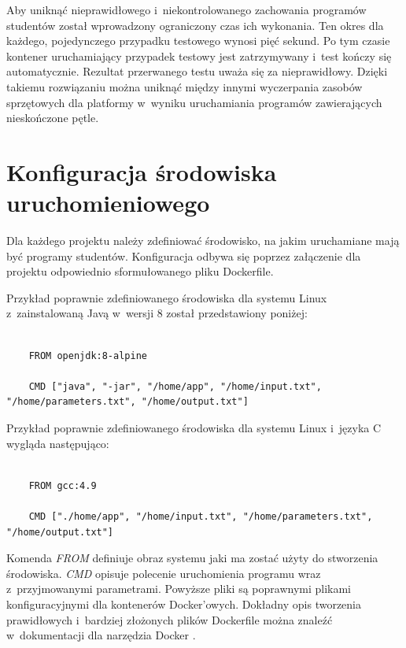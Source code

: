 Aby uniknąć nieprawidłowego i~niekontrolowanego zachowania programów studentów został wprowadzony ograniczony czas ich wykonania.
Ten okres dla każdego, pojedynczego przypadku testowego wynosi pięć sekund.
Po tym czasie kontener uruchamiający przypadek testowy jest zatrzymywany i~test kończy się automatycznie.
Rezultat przerwanego testu uważa się za nieprawidłowy.
Dzięki takiemu rozwiązaniu można uniknąć między innymi wyczerpania zasobów sprzętowych dla platformy w~wyniku uruchamiania programów zawierających nieskończone pętle.


\section {Konfiguracja środowiska uruchomieniowego}
\label{environment_configuration}

Dla każdego projektu należy zdefiniować środowisko, na jakim uruchamiane mają być programy studentów.
Konfiguracja odbywa się poprzez załączenie dla projektu odpowiednio sformułowanego pliku Dockerfile.

Przykład poprawnie zdefiniowanego środowiska dla systemu Linux z~zainstalowaną Javą w~wersji 8 został przedstawiony poniżej:

{\selectfont
\tiny
\begin{lstlisting}

    FROM openjdk:8-alpine

    CMD ["java", "-jar", "/home/app", "/home/input.txt", "/home/parameters.txt", "/home/output.txt"]

\end{lstlisting}
}

Przykład poprawnie zdefiniowanego środowiska dla systemu Linux i~języka C wygląda następująco:

{\selectfont
\tiny
\begin{lstlisting}

    FROM gcc:4.9

    CMD ["./home/app", "/home/input.txt", "/home/parameters.txt", "/home/output.txt"]

\end{lstlisting}
}

Komenda \textit{FROM} definiuje obraz systemu jaki ma zostać użyty do stworzenia środowiska.
\textit{CMD} opisuje polecenie uruchomienia programu wraz z~przyjmowanymi parametrami.
Powyższe pliki są poprawnymi plikami konfiguracyjnymi dla kontenerów Docker'owych.
Dokładny opis tworzenia prawidłowych i~bardziej złożonych plików Dockerfile można znaleźć w~dokumentacji dla narzędzia Docker \cite{docker-config}.

